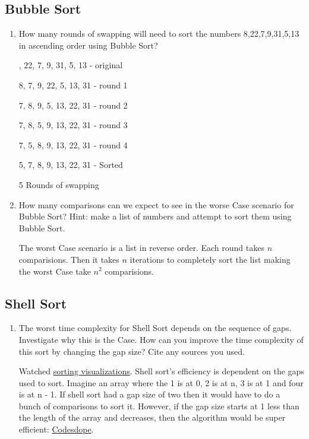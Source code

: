 \documentclass[12pt]{article}
\newenvironment{QandA}{\begin{enumerate}[label=\bfseries\alph*.]\bfseries}
{\end{enumerate}}
\newenvironment{answered}{\par\normalfont}{}
\begin{document}
    \subsection{Bubble Sort}
    \begin{QandA}

    \item How many rounds of swapping will need to sort the numbers 8,22,7,9,31,5,13 in ascending order using Bubble Sort?
        \begin{answered}
            8, 22, 7, 9, 31, 5, 13 - original

            8, 7, 9, 22, 5, 13, 31 - round 1

            7, 8, 9, 5, 13, 22, 31 - round 2

            7, 8, 5, 9, 13, 22, 31 - round 3

            7, 5, 8, 9, 13, 22, 31 - round 4

            5, 7, 8, 9, 13, 22, 31 - Sorted

            5 Rounds of swapping
        \end{answered}

    \item How many comparisons can we expect to see in the worse Case scenario for Bubble Sort? Hint: make a list of numbers and attempt to sort them using Bubble Sort.

        \begin{answered}
            The worst Case scenario is a list in reverse order. Each round takes $n$ comparisions. Then it takes $n$ iterations to completely sort the list making the worst Case take $n^2$ comparisions.
        \end{answered}
    \end{QandA}

    \subsection{Shell Sort}
    \begin{QandA}

    \item The worst time complexity for Shell Sort depends on the sequence of gaps. Investigate why this is the Case. How can you improve the time complexity of this sort by changing the gap size? Cite any sources you used.
        \begin{answered}
            Watched \href{https://www.youtube.com/watch?v=NYWEM7H3iYc\&t=269s}{sorting visualizations}. Shell sort's efficiency is dependent on the gaps used to sort. Imagine an array where the 1 is at 0, 2 is at n, 3 is at 1 and four is at n - 1. If shell sort had a gap size of two then it would have to do a bunch of comparisons to sort it. However, if the gap size starts at 1 less than the length of the array and decreases, then the algorithm would be super efficient: \href{https://www.codesdope.com/blog/article/shell-sort/}{Codesdope}.
        \end{answered}

    \end{QandA}
\end{document}
